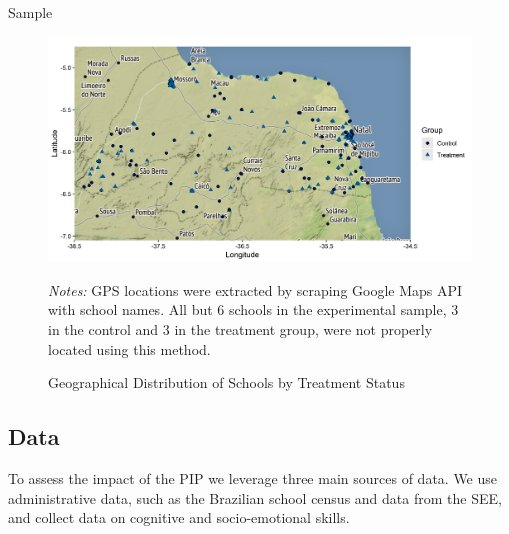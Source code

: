 \documentclass[11pt,a4paper]{article}
\begin{document}
\begin{table}[ht!]
    \caption{Sample}
    \label{tab:sample}
    \centering
    
\end{table}
%

\begin{figure}[ht!]
    \caption{Geographical Distribution of Schools by Treatment Status}
    \label{fig:treat_map}
    \centering
    
    \includegraphics[width=15cm]{DataWork/Output/Figures/fig4-treat_map.png}
    
    \begin{minipage}{0.92\textwidth}
        \small{\textit{Notes:} GPS locations were extracted by scraping Google Maps API with school names. All but 6 schools in the experimental sample, 3 in the control and 3 in the treatment group, were not properly located using this method.}
    \end{minipage}
\end{figure}
%

\clearpage

\subsection{Data} \label{sec:data}

To assess the impact of the PIP we leverage three main sources of data. We use administrative data, such as the Brazilian school census and data from the SEE, and collect data on cognitive and socio-emotional skills.
\end{document}
